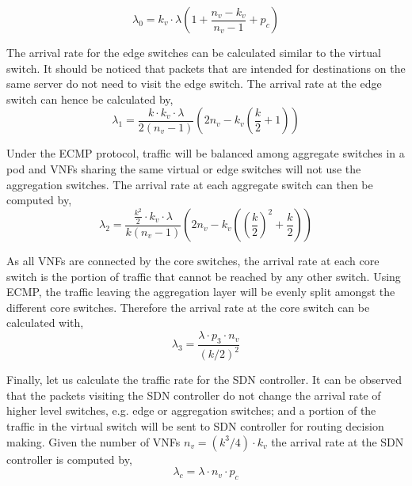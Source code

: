 \begin{equation}
    \label{eq:arr_srv}
    \lambda_0 = k_v \cdot \lambda \left(1+\frac{n_v - k_v}{n_v - 1} + p_c \right)
\end{equation}

The arrival rate for the edge switches can be calculated similar to the virtual switch. It should be noticed that packets that are intended for destinations on the same server do not need to visit the edge switch. The arrival rate at the edge switch can hence be calculated by,
\begin{equation}
    \label{eq:arr_edge}
    \lambda_1 = \frac{k \cdot k_v \cdot \lambda}{2(n_v - 1)}\left(2n_v - k_v \left(\frac{k}{2} + 1 \right)\right)
\end{equation}

Under the ECMP protocol, traffic will be balanced among aggregate switches in a pod and VNFs sharing the same virtual or edge switches will not use the aggregation switches. The arrival rate at each aggregate switch can then be computed by,
\begin{equation}
    \label{eq:arr_agg}
    \lambda_2 = \frac{\frac{k^2}{2} \cdot k_v \cdot \lambda}{k(n_v - 1)}\left(2n_v - k_v \left(\left(\frac{k}{2}\right)^2 + \frac{k}{2} \right)\right)
\end{equation}

As all VNFs are connected by the core switches, the arrival rate at each core switch is the portion of traffic that cannot be reached by any other switch. Using ECMP, the traffic leaving the aggregation layer will be evenly split amongst the different core switches. Therefore the arrival rate at the core switch can be calculated with,
\begin{equation}
    \label{eq:arr_core}
    \lambda_3 =\frac{\lambda \cdot p_3 \cdot n_v}{(k/2)^2}
\end{equation}

Finally, let us calculate the traffic rate for the SDN controller. It can be observed that the packets visiting the SDN controller do not change the arrival rate of higher level switches, e.g. edge or aggregation switches; and a portion of the traffic in the virtual switch will be sent to SDN controller for routing decision making. Given the number of VNFs $n_v = (k^3 / 4) \cdot k_v$ the arrival rate at the SDN controller is computed by,
\begin{equation}
    \label{eq:arr_sdn}
    \lambda_c = \lambda \cdot n_v \cdot p_c
\end{equation}

